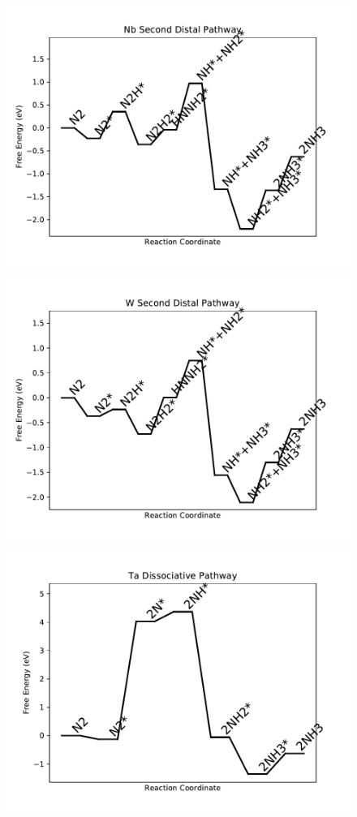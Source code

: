 \begin{figure}
\includegraphics[width=0.8\linewidth]{data/plots/Nb_distal_2.pdf}
\end{figure}

\begin{figure}
\includegraphics[width=0.8\linewidth]{data/plots/W_distal_2.pdf}
\end{figure}

\begin{figure}
\includegraphics[width=0.8\linewidth]{data/plots/Ta_dissociative.pdf}
\end{figure}

